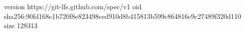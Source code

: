 version https://git-lfs.github.com/spec/v1
oid sha256:90fd168c1b720f8e823498ced910d8b415813b599c864816c9c27489f320d110
size 128313
